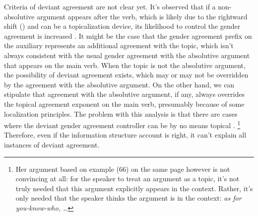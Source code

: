 \documentclass[a4paper, oneside, 12pt]{report}
\newcommand*{\citepage}[1]{p.~{#1}}
\newcommand{\form}[1]{\emph{#1}}
\begin{document}
Criteria of deviant agreement are not clear yet. 
It's observed that if a non-absolutive argument appears after the verb, 
which is likely due to the rightward shift ()
and can be a topicalization device, 
its likelihood to control the gender agreement is increased 
\citep[\citepage{387}, (64)]{forker2020grammar}.
It might be the case that the gender agreement prefix on the auxiliary 
represents an additional agreement with the topic, 
which isn't always consistent with the usual gender agreement with the absolutive argument 
that appears on the main verb.
When the topic is not the absolutive argument, 
the possibility of deviant agreement exists, 
which may or may not be overridden by the agreement with the absolutive argument.
On the other hand, we can stipulate that 
agreement with the absolutive argument, if any, 
always overrides the topical agreement exponent on the main verb, 
presumably because of some localization principles.
The problem with this analysis is that 
there are cases where the deviant gender agreement controller can be by no means topical
\citep[\citepage{388}, (67)]{forker2020grammar}.%
\footnote{
    Her argument based on example (66) on the same page however is not convincing at all: 
    for the speaker to treat an argument as a topic, 
    it's not truly needed that this argument explicitly appears in the context.
    Rather, it's only needed that the speaker thinks the argument is in the context: 
    \form{as for you-know-who, \dots}
}
Therefore, even if the information structure account is right, 
it can't explain all instances of deviant agreement.
\end{document}

